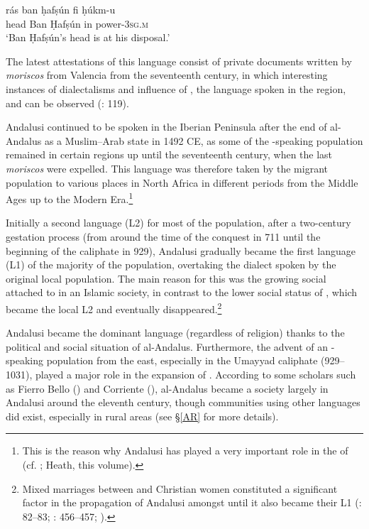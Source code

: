 \documentclass[output=paper,modfonts,nonflat]{langsci/langscibook}
\begin{document}
\ex
\gll rás ban ḥafṣún fi ḥúkm-u \\
head Ban Ḥafṣún in power-\textsc{3sg.m}\\
\glt ‘Ban Ḥafṣún’s head is at his disposal.’
\z
\z

The latest attestations of this language consist of private documents written by \textit{moriscos} from Valencia from the seventeenth century, in which interesting instances of  dialectalisms and influence of , the  language spoken in the region,  and  can be observed (\citealt{BarcelóLabarta2009}: 119).

Andalusi  continued to be spoken in the Iberian Peninsula after the end of al-Andalus as a Muslim–Arab state in 1492 CE, as some of the -speaking population remained in certain regions up until the seventeenth century, when the last \textit{moriscos} were expelled. This language was therefore taken by the migrant population to various places in North Africa in different periods from the Middle Ages up to the Modern Era.\footnote{This is the reason why Andalusi  has played a very important role in the  of   (cf. \citealt{Vicente2010}; Heath, this volume).} 

Initially a second language (L2) for most of the population, after a two-century gestation process (from around the time of the conquest in 711 until the beginning of the caliphate in 929), Andalusi  gradually became the first language (L1) of the majority of the population, overtaking the  dialect spoken by the original local population. The main reason for this was the growing social  attached to  in an Islamic society, in contrast to the lower social status of , which became the local L2 and eventually disappeared.\footnote{Mixed marriages between  and Christian women constituted a significant factor in the propagation of Andalusi  amongst  until it also became their L1 (\citealt{Guichard1989}: 82–83; \citeyear{Guichard1995}: 456–457; \citealt{Chalmeta2003}).}  

Andalusi  became the dominant language (regardless of religion) thanks to the political and social situation of al-Andalus. Furthermore, the advent of an -speaking population from the east, especially in the Umayyad caliphate (929--1031), played a major role in the expansion of . According to some scholars such as Fierro Bello (\citeyear{FierroBello2001}) and Corriente (\citeyear[104]{Corriente2008}), al-Andalus became a society largely  in Andalusi  around the eleventh century, though communities using other languages did exist, especially in rural areas (see §\ref{AR} for more details). 
\end{document}

